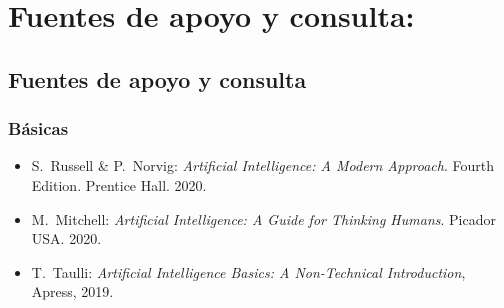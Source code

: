 \section{Fuentes de apoyo y consulta:}
\subsection{Fuentes de apoyo y consulta}
\subsubsection{B\'{a}sicas}

\begin{itemize}[itemsep=0em]
  
\item{S.\ {\sc Russell} \& P.\ {\sc Norvig}: {\em Artificial
    Intelligence: A Modern Approach}. Fourth Edition. Prentice
  Hall. 2020.}

  \item{M.\ {\sc Mitchell}: {\em Artificial Intelligence: A Guide for Thinking Humans}. Picador USA. 2020.}

    \item{T.\ {\sc Taulli}: {\em Artificial Intelligence Basics: A Non-Technical Introduction}, Apress, 2019.}



\end{itemize}


